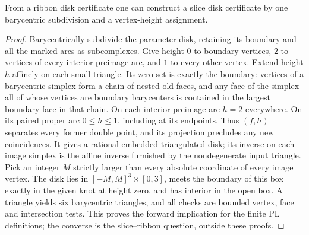 \begin{theorem}
From a ribbon disk certificate one can construct a slice disk certificate by one barycentric subdivision and a vertex-height assignment.
\end{theorem}
\begin{proof}
Barycentrically subdivide the parameter disk, retaining its boundary and all the marked arcs as subcomplexes. Give height $0$ to boundary vertices, $2$ to vertices of every interior preimage arc, and $1$ to every other vertex. Extend height $h$ affinely on each small triangle. Its zero set is exactly the boundary: vertices of a barycentric simplex form a chain of nested old faces, and any face of the simplex all of whose vertices are boundary barycenters is contained in the largest boundary face in that chain. On each interior preimage arc $h=2$ everywhere. On its paired proper arc $0\le h\le1$, including at its endpoints. Thus $(f,h)$ separates every former double point, and its projection precludes any new coincidences. It gives a rational embedded triangulated disk; its inverse on each image simplex is the affine inverse furnished by the nondegenerate input triangle. Pick an integer $M$ strictly larger than every absolute coordinate of every image vertex. The disk lies in $[-M,M]^3\times[0,3]$, meets the boundary of this box exactly in the given knot at height zero, and has interior in the open box. A triangle yields six barycentric triangles, and all checks are bounded vertex, face and intersection tests. This proves the forward implication for the finite PL definitions; the converse is the slice--ribbon question, outside these proofs.
\end{proof}
